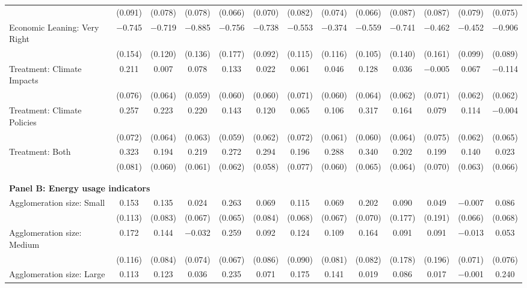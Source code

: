 \begin{tabular}{@{\extracolsep{5pt}}lcccccccccccc}
  & (0.091) & (0.078) & (0.078) & (0.066) & (0.070) & (0.082) & (0.074) & (0.066) & (0.087) & (0.087) & (0.079) & (0.075) \\ 
  Economic Leaning: Very Right & $-$0.745 & $-$0.719 & $-$0.885 & $-$0.756 & $-$0.738 & $-$0.553 & $-$0.374 & $-$0.559 & $-$0.741 & $-$0.462 & $-$0.452 & $-$0.906 \\ 
  & (0.154) & (0.120) & (0.136) & (0.177) & (0.092) & (0.115) & (0.116) & (0.105) & (0.140) & (0.161) & (0.099) & (0.089) \\ 
  Treatment: Climate Impacts & 0.211 & 0.007 & 0.078 & 0.133 & 0.022 & 0.061 & 0.046 & 0.128 & 0.036 & $-$0.005 & 0.067 & $-$0.114 \\ 
  & (0.076) & (0.064) & (0.059) & (0.060) & (0.060) & (0.071) & (0.060) & (0.064) & (0.062) & (0.071) & (0.062) & (0.062) \\ 
  Treatment: Climate Policies & 0.257 & 0.223 & 0.220 & 0.143 & 0.120 & 0.065 & 0.106 & 0.317 & 0.164 & 0.079 & 0.114 & $-$0.004 \\ 
  & (0.072) & (0.064) & (0.063) & (0.059) & (0.062) & (0.072) & (0.061) & (0.060) & (0.064) & (0.075) & (0.062) & (0.065) \\ 
  Treatment: Both & 0.323 & 0.194 & 0.219 & 0.272 & 0.294 & 0.196 & 0.288 & 0.340 & 0.202 & 0.199 & 0.140 & 0.023 \\ 
  & (0.081) & (0.060) & (0.061) & (0.062) & (0.058) & (0.077) & (0.060) & (0.065) & (0.064) & (0.070) & (0.063) & (0.066) \\ 
 \\[1ex] \hline \\[1ex]
\multicolumn{ 13 }{l}{\textbf{ Panel B: Energy usage indicators }} \\
  Agglomeration size: Small & 0.153 & 0.135 & 0.024 & 0.263 & 0.069 & 0.115 & 0.069 & 0.202 & 0.090 & 0.049 & $-$0.007 & 0.086 \\ 
  & (0.113) & (0.083) & (0.067) & (0.065) & (0.084) & (0.068) & (0.067) & (0.070) & (0.177) & (0.191) & (0.066) & (0.068) \\ 
  Agglomeration size: Medium & 0.172 & 0.144 & $-$0.032 & 0.259 & 0.092 & 0.124 & 0.109 & 0.164 & 0.091 & 0.091 & $-$0.013 & 0.053 \\ 
  & (0.116) & (0.084) & (0.074) & (0.067) & (0.086) & (0.090) & (0.081) & (0.082) & (0.178) & (0.196) & (0.071) & (0.076) \\ 
  Agglomeration size: Large & 0.113 & 0.123 & 0.036 & 0.235 & 0.071 & 0.175 & 0.141 & 0.019 & 0.086 & 0.017 & $-$0.001 & 0.240 \\ 

\end{tabular}
